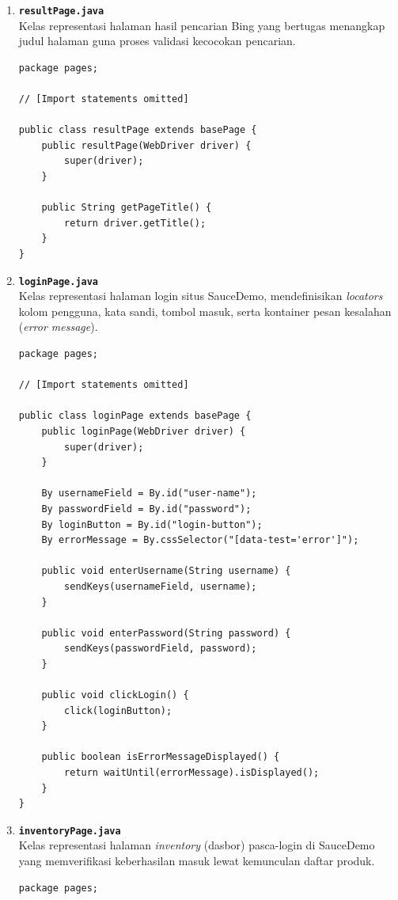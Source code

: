 \documentclass[a4paper,oneside,12pt]{report}
\begin{document}
\begin{enumerate}
    \item \textbf{\texttt{resultPage.java}} \\
          Kelas representasi halaman hasil pencarian Bing yang bertugas menangkap judul halaman guna proses validasi kecocokan pencarian.
          \begin{lstlisting}[style=javastyle, caption={Implementasi Kelas resultPage.java}]
package pages;

// [Import statements omitted]

public class resultPage extends basePage {
    public resultPage(WebDriver driver) {
        super(driver);
    }

    public String getPageTitle() {
        return driver.getTitle();
    }
}
\end{lstlisting}

    \item \textbf{\texttt{loginPage.java}} \\
          Kelas representasi halaman login situs SauceDemo, mendefinisikan \textit{locators} kolom pengguna, kata sandi, tombol masuk, serta kontainer pesan kesalahan (\textit{error message}).
          \begin{lstlisting}[style=javastyle, caption={Implementasi Kelas loginPage.java}]
package pages;

// [Import statements omitted]

public class loginPage extends basePage {
    public loginPage(WebDriver driver) {
        super(driver);
    }

    By usernameField = By.id("user-name");
    By passwordField = By.id("password");
    By loginButton = By.id("login-button");
    By errorMessage = By.cssSelector("[data-test='error']");

    public void enterUsername(String username) {
        sendKeys(usernameField, username);
    }

    public void enterPassword(String password) {
        sendKeys(passwordField, password);
    }

    public void clickLogin() {
        click(loginButton);
    }

    public boolean isErrorMessageDisplayed() {
        return waitUntil(errorMessage).isDisplayed();
    }
}
\end{lstlisting}
          \clearpage
    \item \textbf{\texttt{inventoryPage.java}} \\
          Kelas representasi halaman \textit{inventory} (dasbor) pasca-login di SauceDemo yang memverifikasi keberhasilan masuk lewat kemunculan daftar produk.
          \begin{lstlisting}[style=javastyle, caption={Implementasi Kelas inventoryPage.java}]
package pages;


\end{lstlisting}
\end{enumerate}
\end{document}
